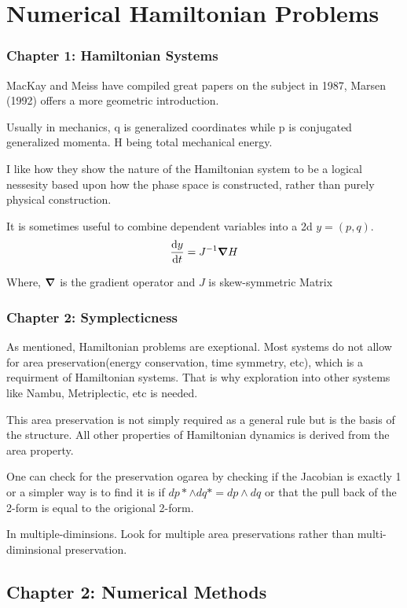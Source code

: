 \chapter{Numerical Hamiltonian Problems}
\subsection{Chapter 1: Hamiltonian Systems}

MacKay and Meiss have compiled great papers on the subject in 1987, Marsen (1992) offers a more geometric introduction.

Usually in mechanics, q is generalized coordinates while p is conjugated generalized momenta. H being total mechanical energy.

I like how they show the nature of the Hamiltonian system to be a logical nessesity based upon how the phase space is constructed, rather than purely physical construction.

It is sometimes useful to combine dependent variables into a 2d $ y = (p,q) $.
$$ \dv{y}{t} =J^{-1} \grad H $$

Where, $\grad $ is the gradient operator and $J$ is skew-symmetric Matrix


\subsection{Chapter 2: Symplecticness}

As mentioned, Hamiltonian problems are exeptional. Most systems do not allow for area preservation(energy conservation, time symmetry, etc), which is a requirment of Hamiltonian systems.
That is why exploration into other systems like Nambu, Metriplectic, etc is needed.

This area preservation is not simply required as a general rule but is the basis of the structure. All other properties of Hamiltonian dynamics is derived from the area property.

One can check for the preservation ogarea by checking if the Jacobian is exactly 1 or a simpler way is to find it is if $ dp* \wedge dq* = dp \wedge dq $ or that the pull back of the 2-form is equal to the origional 2-form.

In multiple-diminsions. Look for multiple area preservations rather than multi-diminsional preservation.

\section{Chapter 2: Numerical Methods}

